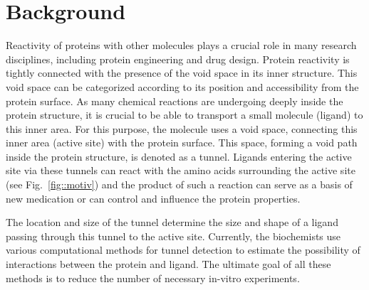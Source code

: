 \documentclass{bmcart}
\begin{document}


\section*{Background}

Reactivity of proteins with other molecules plays a crucial role in many research disciplines, including protein engineering and drug design.
Protein reactivity is tightly connected with the presence of the void space in its inner structure.
This void space can be categorized according to its position and accessibility from the protein surface. 
As many chemical reactions are undergoing deeply inside the protein structure, it is crucial to be able to transport a small molecule (ligand) to this inner area.
For this purpose, the molecule uses a void space, connecting this inner area (active site) with the protein surface.
This space, forming a void path inside the protein structure, is denoted as a tunnel.
Ligands entering the active site via these tunnels can react with the amino acids surrounding the active site~\cite{gora2013gates,marques2017enzyme} (see Fig.~\ref{fig::motiv}) and the product of such a reaction can serve as a basis of new medication or can control and influence the protein properties. 
 
The location and size of the tunnel determine the size and shape of a ligand passing through this tunnel to the active site.
Currently, the biochemists use various computational methods for tunnel detection to estimate the possibility of interactions between the protein and ligand.
The ultimate goal of all these methods is to reduce the number of necessary in-vitro experiments.
\end{document}
